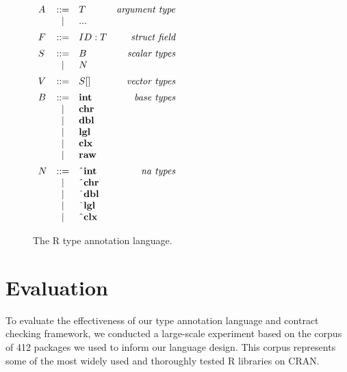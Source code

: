 \documentclass[acmsmall,review,anonymous]{acmart}\settopmatter{printfolios=true,printccs=false,printacmref=false}
\begin{document}
\begin{figure}
    \hfill
    \begin{minipage}{.45\linewidth}
    \begin{flushright}
    $ \begin{array}{lclr}
    A & ::= & T & \text{\it argument type} \\
      & |   & {\bf ...} \vspace{5pt} \\
    F & ::= & ID : T & \text{\it struct field}\vspace{5pt}\\
    S & ::= & B & \text{\it scalar types} \\
      & |   & N \vspace{5pt}\\
    V & ::= & S \lbrack \rbrack & \text{\it vector types} \vspace{5pt}\\
    B & ::= & {\bf int} & \text{\it base types} \\
      & |   & {\bf chr} \\
      & |   & {\bf dbl} \\
      & |   & {\bf lgl} \\
      & |   & {\bf clx} \\
      & |   & {\bf raw} \vspace{5pt}\\
    N & ::= & {\bf \string^int} & \text{\it na types} \\
      & |   & {\bf \string^chr} \\
      & |   & {\bf \string^dbl} \\
      & |   & {\bf \string^lgl} \\
      & |   & {\bf \string^clx} \\
\end{array} $
    \end{flushright}
    \end{minipage}
    \caption{The R type annotation language.}
    \label{fig:types}
\end{figure}

%
%
%
%
%
%
\section{Evaluation}
\label{sec:evaluation}

To evaluate the effectiveness of our type annotation language and contract checking framework, we conducted a large-scale experiment based on the corpus of 412 packages we used to inform our language design.
This corpus represents some of the most widely used and thoroughly tested R libraries on CRAN.
\end{document}
